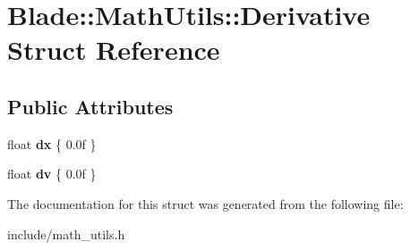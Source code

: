 \hypertarget{struct_blade_1_1_math_utils_1_1_derivative}{}\section{Blade\+:\+:Math\+Utils\+:\+:Derivative Struct Reference}
\label{struct_blade_1_1_math_utils_1_1_derivative}
\subsection*{Public Attributes}
\begin{DoxyCompactItemize}
\item 
\mbox{\label{struct_blade_1_1_math_utils_1_1_derivative_a25af28311120b67886338dc29e239442}} 
float {\bfseries dx} \{ 0.\+0f \}
\item 
\mbox{\label{struct_blade_1_1_math_utils_1_1_derivative_a48838efe113d4da5ae478493af434dfb}} 
float {\bfseries dv} \{ 0.\+0f \}
\end{DoxyCompactItemize}


The documentation for this struct was generated from the following file\+:\begin{DoxyCompactItemize}
\item 
include/math\+\_\+utils.\+h\end{DoxyCompactItemize}
